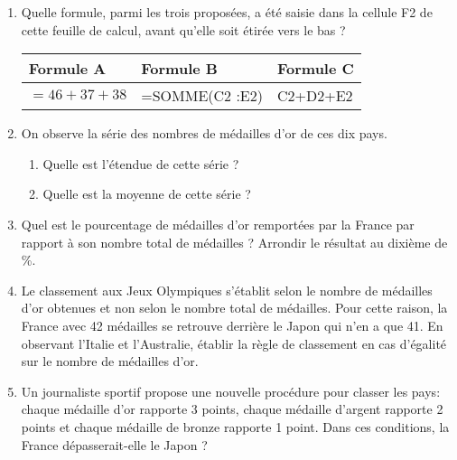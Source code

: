 \begin{enumerate}
\item Quelle formule, parmi les trois proposées, a été saisie dans la cellule F2 de
cette feuille de calcul, avant qu'elle soit étirée vers le bas ?
\begin{center}
\begin{tabularx}{\linewidth}{|*{3}{>{\centering \arraybackslash}X|}}\hline
Formule A &Formule B &Formule C\\ \hline
$=46+37+38$ &=SOMME(C2 :\:E2) &C2+D2+E2\\ \hline
\end{tabularx}
\end{center}

\item  On observe la série des nombres de médailles d'or de ces dix pays.
	\begin{enumerate}
		\item Quelle est l'étendue de cette série ?
		\item Quelle est la moyenne de cette série ?
 	\end{enumerate}
\item  Quel est le pourcentage de médailles d'or remportées par la France par rapport
à son nombre total de médailles ? Arrondir le résultat au dixième de \,\%.
\item  Le classement aux Jeux Olympiques s'établit selon le nombre de médailles d'or
obtenues et non selon le nombre total de médailles. Pour cette raison, la France
avec 42 médailles se retrouve derrière le Japon qui n'en a que 41. En observant
l'Italie et l'Australie, établir la règle de classement en cas d'égalité sur le nombre
de médailles d'or.
\item  Un journaliste sportif propose une nouvelle procédure pour classer les pays:
chaque médaille d'or rapporte 3 points, chaque médaille d'argent rapporte 2
points et chaque médaille de bronze rapporte 1 point. Dans ces conditions, la
France dépasserait-elle le Japon ?
\end{enumerate}

\vspace{0,5cm}


